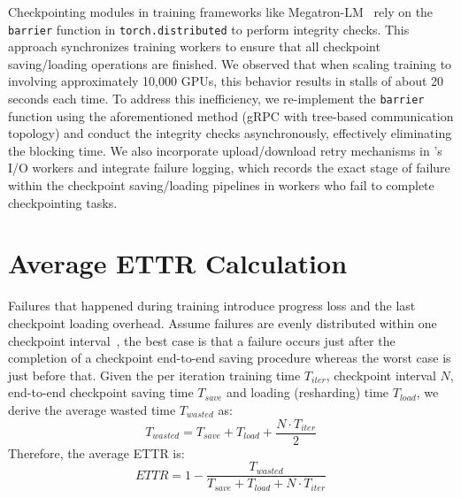 Checkpointing modules in training frameworks like Megatron-LM~\cite{megatron} rely on the \texttt{barrier} function in \texttt{torch.distributed} to perform integrity checks.
This approach synchronizes training workers to ensure that all checkpoint saving/loading operations are finished.
We observed that when scaling training to involving approximately 10,000 GPUs, this behavior results in stalls of about 20 seconds each time.
To address this inefficiency, we re-implement the \texttt{barrier} function using the aforementioned method (gRPC with tree-based communication topology) 
and conduct the integrity checks asynchronously, 
effectively eliminating the blocking time. We also incorporate upload/download retry mechanisms in \sys{}'s I/O workers
and integrate failure logging, which records the exact stage of failure within the checkpoint saving/loading pipelines in workers who fail to complete checkpointing tasks.

\section{Average ETTR Calculation}\label{sec:ettr_cal}
Failures that happened during training introduce progress loss and the last checkpoint loading overhead.
Assume failures are evenly distributed within one checkpoint interval~\cite{gemini-sys}, the best case is that a failure occurs just after the completion of a checkpoint end-to-end saving procedure whereas the worst case is just before that.
Given the per iteration training time $T_{iter}$, checkpoint interval $N$, end-to-end checkpoint saving time $T_{save}$ and loading (resharding) time $T_{load}$, we derive the average wasted time $T_{wasted}$ as:
\begin{equation}
    T_{wasted} = T_{save} + T_{load} + \frac{N \cdot T_{iter}}{2}
\end{equation}
Therefore, the average ETTR is:
\begin{equation}
    ETTR = 1 - \frac{T_{wasted}}{T_{save} + T_{load} + N\cdot T_{iter}}
\end{equation}

